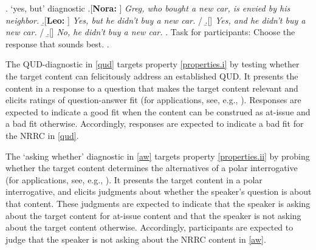 \documentclass[times,linguex]{glossa}
\begin{document}
\ex. \label{yesbut}%
`yes, but' diagnostic %
\a.[{\bf Nora: }] \emph{Greg, who bought a new car, is envied by his neighbor.}
\b.[{\bf Leo: }] \emph{Yes, but he didn't buy a new car.} /
\b.[] \hspace*{0em} \emph{Yes, and he didn't buy a new car.} /
\b.[] \hspace*{0em} \emph{No, he didn't buy a new car.}
\z.
Task for participants: Choose the response that sounds best.
\z.

The QUD-diagnostic in \ref{qud} targets property \ref{properties.i}  by testing whether the target content can felicitously address an established QUD. It presents the content in a response to a question that makes the target content relevant and elicits ratings of question-answer fit (for applications, see, e.g., \citealt{amaral_review_2007,lee_evidentiality_2011,tonhauser_diagnosing_2012,chen_presuppositions_2024}). Responses are expected to indicate a good fit when the content can be construed as at-issue and a bad fit otherwise. Accordingly, responses are expected to indicate a bad fit for the  NRRC in \ref{qud}.

The `asking whether' diagnostic in \ref{aw}  targets property \ref{properties.ii} by probing whether the target content determines the alternatives of a polar interrogative (for applications, see, e.g., \citealt{tonhauser_how_2018,solstad_cataphoric_2024,degen_projection_2025}). It presents the target content in a polar interrogative, and elicits judgments about whether the speaker's question is about that content. These judgments are expected to indicate that the speaker is asking about the target content  for at-issue content and that the speaker is not asking about the target content otherwise. Accordingly, participants are expected to judge that the speaker is not asking about the NRRC content in \ref{aw}.
\end{document}
